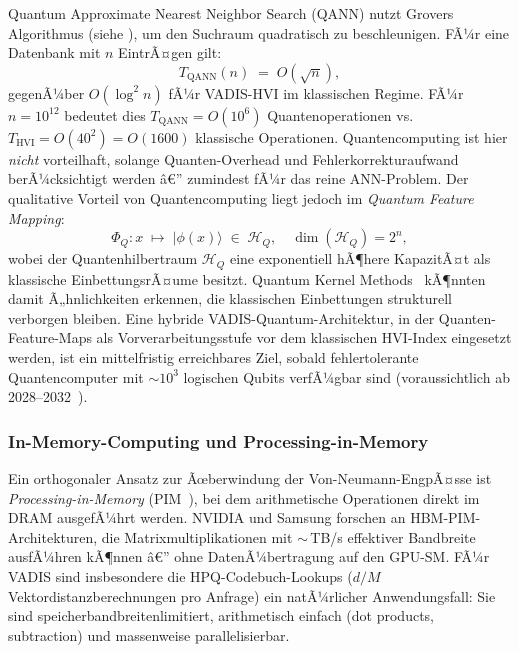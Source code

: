 ﻿\documentclass[12pt,a4paper]{article}
\begin{document}
Quantum Approximate Nearest Neighbor Search (QANN)
nutzt Grovers Algorithmus (siehe \cite{grover1996fast}),
um den Suchraum quadratisch zu beschleunigen.
FÃ¼r eine Datenbank mit $n$ EintrÃ¤gen gilt:
\begin{equation}
  T_{\text{QANN}}(n) \;=\; O\!\left(\sqrt{n}\right),
\end{equation}
gegenÃ¼ber $O(\log^2 n)$ fÃ¼r VADIS-HVI im klassischen Regime.
FÃ¼r $n = 10^{12}$ bedeutet dies $T_{\text{QANN}} = O(10^6)$
Quantenoperationen vs. $T_{\text{HVI}} = O(40^2) = O(1600)$
klassische Operationen. Quantencomputing ist hier
\emph{nicht} vorteilhaft, solange Quanten-Overhead und
Fehlerkorrekturaufwand berÃ¼cksichtigt werden â€” zumindest
fÃ¼r das reine ANN-Problem. Der qualitative Vorteil
von Quantencomputing liegt jedoch im
\emph{Quantum Feature Mapping}:
\begin{equation}
  \Phi_Q: x \;\mapsto\; |\phi(x)\rangle \;\in\;
  \mathcal{H}_Q,\quad \dim(\mathcal{H}_Q) = 2^n,
\end{equation}
wobei der Quantenhilbertraum $\mathcal{H}_Q$ eine
exponentiell hÃ¶here KapazitÃ¤t als klassische
EinbettungsrÃ¤ume besitzt. Quantum Kernel
Methods~\cite{havlicek2019supervised} kÃ¶nnten damit
Ã„hnlichkeiten erkennen, die klassischen Einbettungen
strukturell verborgen bleiben. Eine hybride
VADIS-Quantum-Architektur, in der Quanten-Feature-Maps
als Vorverarbeitungs\-stufe vor dem klassischen HVI-Index
eingesetzt werden, ist ein mittelfristig erreichbares Ziel,
sobald fehlertolerante Quantencomputer mit $\sim 10^3$
logischen Qubits verfÃ¼gbar sind
(voraussichtlich ab 2028--2032~\cite{preskill2018quantumcomputing}).

\subsubsection{In-Memory-Computing und Processing-in-Memory}

Ein orthogonaler Ansatz zur Ãœberwindung der
Von-Neumann-EngpÃ¤sse ist \emph{Processing-in-Memory}
(PIM~\cite{ghose2019processing}), bei dem arithmetische
Operationen direkt im DRAM ausgefÃ¼hrt werden.
NVIDIA und Samsung forschen an HBM-PIM-Architekturen,
die Matrixmultiplikationen mit $\sim$\,TB/s effektiver
Bandbreite ausfÃ¼hren kÃ¶nnen â€” ohne DatenÃ¼bertragung
auf den GPU-SM. FÃ¼r VADIS sind insbesondere die
HPQ-Codebuch-Lookups ($d/M$ Vektordistanzberechnungen
pro Anfrage) ein natÃ¼rlicher Anwendungsfall: Sie sind
speicherbandbreitenlimitiert, arithmetisch einfach
(dot products, subtraction) und massenweise parallelisierbar.
\end{document}
